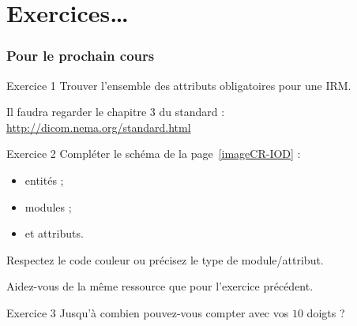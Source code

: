 \section{Exercices\ldots}

	\frame
	{
		\frametitle{Pour le prochain cours}
		
		{
			\begin{block}{Exercice 1}
				Trouver l'ensemble des attributs obligatoires pour une IRM.

				Il faudra regarder le chapitre 3 du standard : \url{http://dicom.nema.org/standard.html}
			\end{block}
		}

		{
			\begin{block}{Exercice 2}
				Compl\'eter le sch\'ema de la page~\ref{imageCR-IOD} :
				\begin{itemize}
					\item entit\'es ;
					\item modules ;
					\item et attributs.
				\end{itemize}
				Respectez le code couleur ou pr\'ecisez le type de module/attribut.

				Aidez-vous de la m\^eme ressource que pour l'exercice pr\'ec\'edent.
			\end{block}
		}

		{
			\begin{block}{Exercice 3}
				Jusqu'\`a combien pouvez-vous compter avec vos $10$ doigts ?
			\end{block}
		}
	}

